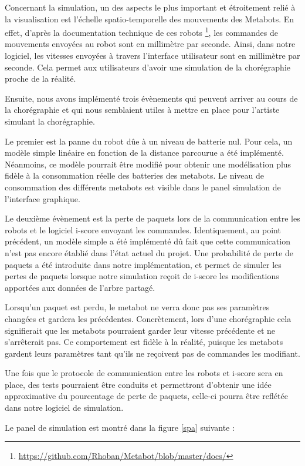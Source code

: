 Concernant la simulation, un des aspects le plus important et étroitement relié à la visualisation est l'échelle spatio-temporelle des mouvements des Metabots. En effet, d'après la documentation technique de ces robots \footnote{\url{https://github.com/Rhoban/Metabot/blob/master/docs/}}, les commandes de mouvements envoyées au robot sont en millimètre par seconde. Ainsi, dans notre logiciel, les vitesses envoyées à travers l'interface utilisateur sont en millimètre par seconde. Cela permet aux utilisateurs d'avoir une simulation de la chorégraphie proche de la réalité.

Ensuite, nous avons implémenté trois évènements qui peuvent arriver au cours de la chorégraphie et qui nous semblaient utiles à mettre en place pour l'artiste simulant la chorégraphie. 

Le premier est la panne du robot dûe à un niveau de batterie nul. Pour cela, un modèle simple linéaire en fonction de la distance parcourue a été implémenté. Néanmoins, ce modèle pourrait être modifié pour obtenir une modélisation plus fidèle à la consommation réelle des batteries des metabots. Le niveau de consommation des différents metabots est visible dans le panel simulation de l'interface graphique. 

Le deuxième évènement est la perte de paquets lors de la communication entre les robots et le logiciel i-score envoyant les commandes. Identiquement, au point précédent, un modèle simple a été implémenté dû fait que cette communication n'est pas encore établié dans l'état actuel du projet. Une probabilité de perte de paquets a été introduite dans notre implémentation, et permet de simuler les pertes de paquets lorsque notre simulation reçoit de i-score les modifications apportées aux données de l'arbre partagé. 

Lorsqu'un paquet est perdu, le metabot ne verra donc pas ses paramètres changées et gardera les précédentes. Concrètement, lors d'une chorégraphie cela signifierait que les metabots pourraient garder leur vitesse précédente et ne s'arrêterait pas. Ce comportement est fidèle à la réalité, puisque les metabots gardent leurs paramètres tant qu'ils ne reçoivent pas de commandes les modifiant. 

Une fois que le protocole de communication entre les robots et i-score sera en place, des tests pourraient être conduits et permettront d'obtenir une idée approximative du pourcentage de perte de paquets, celle-ci pourra être reflétée dans notre logiciel de simulation.

Le panel de simulation est montré dans la figure \ref{spa} suivante :

